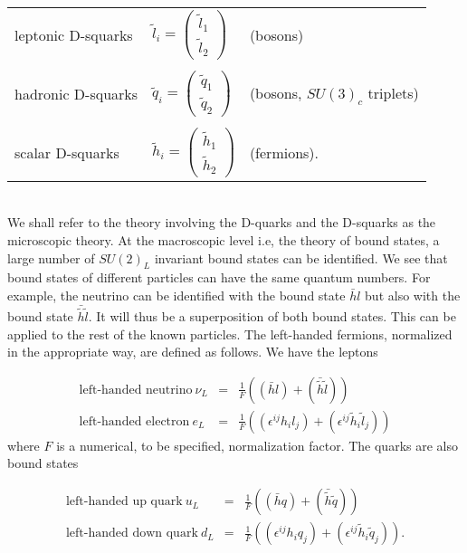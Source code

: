 \documentclass[a4paper,12pt]{article}
\begin{document}
\begin{tabular}{lll}
leptonic D-squarks & $\tilde{l}_i=  \left(\begin{array}{c}
    \tilde{l}_1 \\ \tilde{l}_2 \end{array}
\right )$  &  (bosons)  \\
& & \\
hadronic  D-squarks   & $\tilde{q}_i= \left(\begin{array}{c}
    \tilde{q}_1 \\ \tilde{q}_2\end{array}
\right )$   &  (bosons, $SU(3)_c$ triplets) \\ 
& & \\
scalar D-squarks  &  $\tilde{h}_i= \left(
  \begin{array}{c}
  \tilde{h}_1 \\ \tilde{h}_2
  \end{array}
\right )$ & (fermions).
\end{tabular}
\\
We shall refer to the theory involving the D-quarks and the
D-squarks as the microscopic theory. At the macroscopic level i.e,
the theory of bound states, a large number of $SU(2)_L$ invariant bound
states can be identified.  We see that bound states of different
particles can have the same quantum numbers. For example, the neutrino
can be identified with the bound state $\bar h l$ but also with the
bound state $\bar{\tilde{h}} \tilde{l}$.  It will thus be a
superposition of both bound states. This can be
applied to the rest of the known particles. The left-handed
fermions, normalized in the appropriate way, are defined as
follows. We have the leptons

\begin{eqnarray} \label{eq1}
\mbox{left-handed neutrino} \ \nu_L &=& \frac{1}{F}
\left ( (\bar h l) +  (\bar{\tilde{h}} \tilde{l}) \right ) \\
\mbox{left-handed electron} \ e_L &=& \frac{1}{F}
\left ( (\epsilon^{ij} h_i l_j)
+  (\epsilon^{ij} \tilde{h}_i \tilde{l}_j) \right ) \nonumber
\end{eqnarray}
where $F$ is a numerical, to be specified, normalization factor. The
quarks are also bound states

\begin{eqnarray} \label{eq2}
\mbox{left-handed up quark} \ u_L &=& \frac{1}{F}
\left ( (\bar h q) +  (\bar{\tilde{h}} \tilde{q}) \right ) \\
\mbox{left-handed down quark} \ d_L &=& \frac{1}{F}
\left ( (\epsilon^{ij} h_i q_j)
+  (\epsilon^{ij} \tilde{h}_i \tilde{q}_j) \right ). \nonumber
\end{eqnarray}
\end{document}
